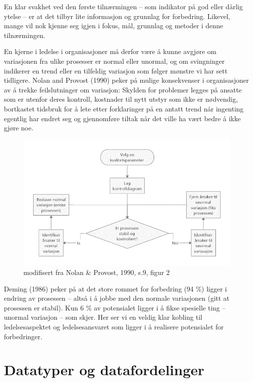 \documentclass[
]{book}
\begin{document}
En klar svakhet ved den første tilnærmingen -- som indikator på god eller dårlig ytelse -- er at det tilbyr lite informasjon og grunnlag for forbedring. Likevel, mange vil nok kjenne seg igjen i fokus, mål, grunnlag og metoder i denne tilnærmingen.

En kjerne i ledelse i organisasjoner må derfor være å kunne avgjøre om variasjonen fra ulike prosesser er normal eller unormal, og om svingninger indikerer en trend eller en tilfeldig variasjon som følger mønstre vi har sett tidligere. Nolan and Provost (1990) peker på mulige konsekvenser i organisasjoner av å trekke feilslutninger om variasjon: Skylden for problemer legges på ansatte som er utenfor deres kontroll, kostnader til nytt utstyr som ikke er nødvendig, bortkastet tidsbruk for å lete etter forklaringer på en antatt trend når ingenting egentlig har endret seg og gjennomføre tiltak når det ville ha vært bedre å ikke gjøre noe.

\begin{figure}
\centering
\includegraphics{nolan_provost.png}
\caption{modifisert fra Nolan \& Provost, 1990, s.9, figur 2}
\end{figure}

Deming (1986) peker på at det store rommet for forbedring (94 \%) ligger i endring av prosessen -- altså i å jobbe med den normale variasjonen (gitt at prosessen er stabil). Kun 6 \% av potensialet ligger i å fikse spesielle ting -- unormal variasjon -- som skjer. Her ser vi en veldig klar kobling til ledelsesaspektet og ledelsesansvaret som ligger i å realisere potensialet for forbedringer.

\hypertarget{datatyper-og-datafordelinger}{%
\chapter{Datatyper og datafordelinger}\label{datatyper-og-datafordelinger}}
\end{document}
